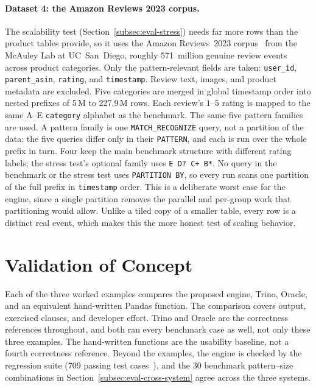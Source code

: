 \paragraph{Dataset 4: the Amazon Reviews 2023 corpus.}
The scalability test (Section~\ref{subsec:eval-stress}) needs far more
rows than the product tables provide, so it uses the Amazon
Reviews~2023 corpus~\cite{hou2024amazonreviews} from the McAuley Lab at
UC~San~Diego, roughly 571~million genuine review events across product
categories.  Only the pattern-relevant fields are taken:
\texttt{user\_id}, \texttt{parent\_asin}, \texttt{rating}, and
\texttt{timestamp}.  Review text, images, and product metadata are
excluded.  Five categories are merged in global timestamp order into
nested prefixes of 5\,M to 227.9\,M rows.  Each review's
$1$--$5$ rating is mapped to the same A--E \texttt{category} alphabet as
the benchmark.  The same five pattern families are used.  A pattern
family is one \texttt{MATCH\_RECOGNIZE} query, not a partition of the
data: the five queries differ only in their \texttt{PATTERN}, and each
is run over the whole prefix in turn.  Four keep the main benchmark
structure with different rating labels; the stress test's optional
family uses \texttt{E D? C+ B*}.  No query in the benchmark or the
stress test uses \texttt{PARTITION BY}, so every run scans one
partition of the full prefix in \texttt{timestamp} order.  This is a
deliberate worst case for the engine, since a single partition removes
the parallel and per-group work that partitioning would allow.
Unlike a tiled copy of a smaller table, every row is a distinct real
event, which makes this the more honest test of scaling behavior.

\section{Validation of Concept}
\label{sec:eval-correctness}

Each of the three worked examples compares the proposed engine,
Trino, Oracle, and an equivalent hand-written Pandas function.  The
comparison covers output, exercised clauses, and developer effort.
Trino and Oracle are the correctness references throughout, and both
ran every benchmark case as well, not only these three examples.  The
hand-written functions are the usability baseline, not a fourth
correctness reference.
Beyond the examples, the engine is checked by the regression suite (709
passing test cases~\cite{monierashraf2025tests}), and the 30 benchmark
pattern--size combinations in Section~\ref{subsec:eval-cross-system}
agree across the three systems.

